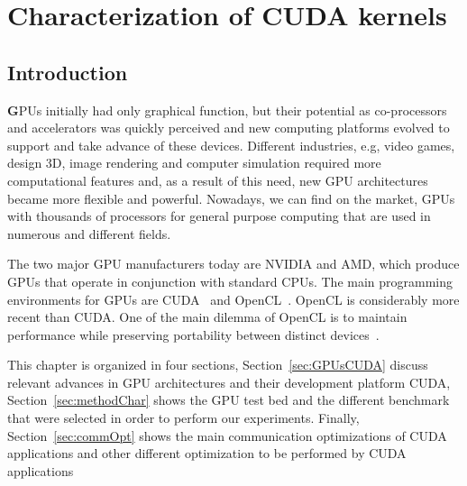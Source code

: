 \chapter{Characterization of CUDA kernels}\label{chap:characterization}
\section{Introduction}
\label{sec:IntroGPU}
\lettrine[findent=2pt]{\textbf{G}}{}PUs initially had only graphical function, but their potential as co-processors and accelerators was quickly perceived and new computing platforms evolved to support and take advance of these devices. Different industries, e.g, video games, design 3D, image rendering and computer simulation required more computational features and, as a result of this need, new GPU architectures became more flexible and powerful. Nowadays, we can find on the market, GPUs with thousands of processors for general purpose computing that are used in numerous and different fields. 

The two major GPU manufacturers today are NVIDIA and AMD, which produce GPUs that operate in conjunction with standard CPUs. The main programming environments for GPUs are CUDA~\citep{CUDAGuide} and OpenCL~\citep{khronos:opencl}. OpenCL is considerably more recent than CUDA. One of the main dilemma of OpenCL is to maintain performance while preserving portability between distinct devices~\citep{Du2012391}. 


This chapter is organized in four sections, Section~\ref{sec:GPUsCUDA} discuss relevant advances in GPU architectures and their development platform CUDA, Section~\ref{sec:methodChar} shows the GPU test bed and the different benchmark that were selected in order to perform our experiments. Finally, Section~\ref{sec:commOpt} shows the main communication optimizations of CUDA applications and other different optimization to be performed by CUDA applications


